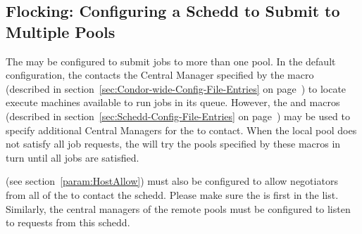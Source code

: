 \subsection{\label{sec:Flocking}
Flocking: Configuring a Schedd to Submit to Multiple Pools}

The  may be configured to submit jobs to more than one
pool.
In the default configuration, the  contacts the
Central Manager specified by the  macro (described
in section~\ref{sec:Condor-wide-Config-File-Entries} on
page~\pageref{sec:Condor-wide-Config-File-Entries})
to locate execute machines
available to run jobs in its queue.
However, the
 and 
macros (described in
section~\ref{sec:Schedd-Config-File-Entries} on
page~\pageref{sec:Schedd-Config-File-Entries}) may 
be used to specify additional 
Central Managers for the  to contact.
When the local
pool does not satisfy all job requests, the  will try
the pools specified by these macros in turn until all jobs are
satisfied.

 (see
section~\ref{param:HostAllow}) must also be configured to allow
negotiators from all of the  to contact the schedd.
Please make sure the  is first in the 
 list.
Similarly, the central managers of the remote pools must be configured
to listen to requests from this schedd.
